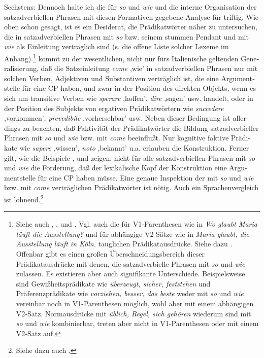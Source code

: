 \documentclass[output=paper, colorlinks, citecolor=brown, booklanguage=german]{langscibook}
\begin{document}
\begin{otherlanguage}{german}
\largerpage[2]
Sechstens: Dennoch halte ich die für \textit{so} und \textit{wie} und die interne Organisation der satzadverbiellen Phrasen mit diesen Formativen gegebene Analyse für triftig. Wie oben schon gesagt, ist es ein Desiderat, die Prädikatwörter näher zu untersuchen, die in satzadverbiellen Phrasen mit \textit{so} bzw. seinem stummen Pendant und mit \textit{wie} als Einleitung verträglich sind (s. die offene Liste solcher Lexeme im Anhang).\footnote{Siehe auch \citet{brandt1997derredesituierendewiesatz}, \citet{sitta70}, \citet{eggers1972partikelwie} und \citet{cinque1989embedded, cinque1990two}. Vgl. auch die für V1-Parenthesen wie in \textit{Wo glaubt Maria läuft die Ausstellung?} und für abhängige V2-Sätze wie in \textit{Maria glaubt, die Ausstellung läuft in Köln.} tauglichen Prädikatausdrücke. Siehe dazu \citet{reis95, reis96a, reis96b}. Offenbar gibt es einen großen Überschneidungsbereich dieser Prädikatausdrücke mit denen, die satzadverbielle Phrasen mit \textit{so} und \textit{wie} zulassen. Es existieren aber auch signifikante Unterschiede. Beispielsweise sind Gewißheitsprädikate wie \textit{überzeugt, sicher, feststehen} und Präferenzprädikate wie \textit{vorziehen, besser, das beste} weder mit \textit{so} und \textit{wie} vereinbar noch in V1-Parenthesen möglich, wohl aber mit einem abhängigen V2-Satz. Normausdrücke mit \textit{üblich, Regel, sich gehören} wiederum sind mit \textit{so} und \textit{wie} kombinierbar, treten aber nicht in V1-Parenthesen oder mit einem V2-Satz auf.} \citet{cinque1989embedded, cinque1990two} kommt zu der wesentlichen, nicht nur fürs Italienische geltenden Generalisierung, daß die Satzeinleitung \textit{come} ,wie' in satzadverbiellen Phrasen nur mit solchen Verben, Adjektiven und Substantiven verträglich ist, die eine Argumentstelle für eine CP haben, und zwar in der Po\-si\-tion des direkten Objekts, wenn es sich um transitive Verben wie \textit{sperare} ,hoffen', \textit{dire} ,sagen' usw. handelt, oder in der Po\-si\-tion des Subjekts von ergativen Prädikatwörtern wie \textit{succedere} ,vorkommen', \textit{prevedibile} ,vorhersehbar' usw. Neben dieser Bedingung ist allerdings zu beachten, daß Faktivität der Prädikatwörter die Bildung satzadverbieller Phrasen mit \textit{so} und \textit{wie} bzw. mit \textit{come} beeinflußt. Nur kognitive faktive Prädikate wie \textit{sapere} ,wissen', \textit{noto} ,bekannt' u.a. erlauben die Konstruktion. Ferner gilt, wie die Beispiele ,  und  zeigen, nicht für alle satzadverbiellen Phrasen mit \textit{so} und \textit{wie} die Forderung, daß der lexikalische Kopf der Konstruktion eine Argumentstelle für eine CP haben müsse. Eine genaue Inspektion der mit \textit{so} und \textit{wie} bzw. mit \textit{come} verträglichen Prädikatwörter ist nötig. Auch ein Sprachenvergleich ist lohnend.\footnote{Siehe dazu auch \citet{brandt1997derredesituierendewiesatz}.}


\end{otherlanguage}
\end{document}
